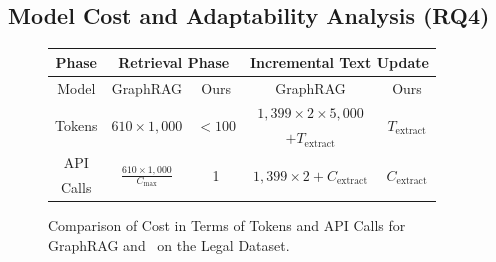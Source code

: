 \vspace{-0.05in}
\subsection{Model Cost and Adaptability Analysis (RQ4)}
\vspace{-0.05in}

\begin{figure}
    \vspace{-0.18in}
    \centering
    \caption{Comparison of Cost in Terms of Tokens and API Calls for GraphRAG and \model\ on the Legal Dataset.}
    \vspace{-0.1in}
    \label{tab:cost}
    \centering
    \scriptsize
    \setlength{\tabcolsep}{0.3mm}
    \begin{tabular}{|c|c|c|c|c|}
        \hline
        Phase & \multicolumn{2}{c|}{Retrieval Phase} & \multicolumn{2}{c|}{Incremental Text Update} \\ \hline
        Model & GraphRAG & Ours & GraphRAG & Ours \\ \hline
        \multirow{2}{*}{Tokens} & \multirow{2}{*}{$610 \times 1{,}000$} & \multirow{2}{*}{$< 100$} & $1{,}399 \times 2 \times 5{,}000$ & \multirow{2}{*}{$T_{\text{extract}}$} \\ 
        &&&$+ T_{\text{extract}}$& \\
        \hline
        API & \multirow{2}{*}{$\frac{610 \times 1{,}000}{C_{\text{max}}}$} & \multirow{2}{*}{1} & \multirow{2}{*}{$1{,}399 \times 2 + C_{\text{extract}}$} & \multirow{2}{*}{$C_{\text{extract}}$}\\
        Calls & &&&\\\hline
    \end{tabular}
    \vspace{-0.15in}
\end{figure}

